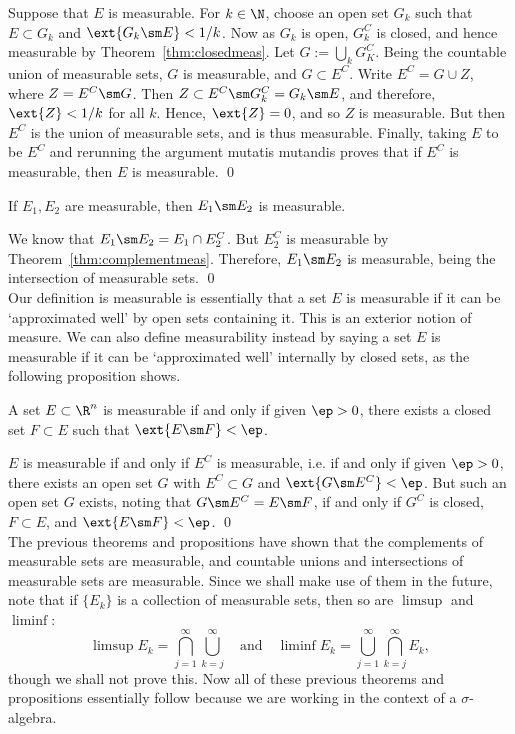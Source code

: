 \pf Suppose that $E$ is measurable. For $k \in \N$, choose an open set $G_k$ such that $E \subset G_k$ and $\ext{G_k \sm E}<1/k$. Now as $G_k$ is open, $G_k^C$ is closed, and hence measurable by Theorem~\ref{thm:closedmeas}. Let $G:= \bigcup_k G_K^C$. Being the countable union of measurable sets, $G$ is measurable, and $G \subset E^C$. Write $E^C= G \cup Z$, where $Z= E^C \sm G$. Then $Z \subset E^C \sm G_k^C= G_k \sm E$, and therefore, $\ext{Z}< 1/k$ for all $k$. Hence, $\ext{Z}=0$, and so $Z$ is measurable. But then $E^C$ is the union of measurable sets, and is thus measurable. Finally, taking $E$ to be $E^C$ and rerunning the argument mutatis mutandis proves that if $E^C$ is measurable, then $E$ is measurable. \qed \\


\begin{cor}
If $E_1, E_2$ are measurable, then $E_1 \sm E_2$ is measurable.
\end{cor}

\pf We know that $E_1 \sm E_2= E_1 \cap E_2^C$. But $E_2^C$ is measurable by Theorem~\ref{thm:complementmeas}. Therefore, $E_1 \sm E_2$ is measurable, being the intersection of measurable sets. \qed \\


Our definition is measurable is essentially that a set $E$ is measurable if it can be `approximated well' by open sets containing it. This is an exterior notion of measure. We can also define measurability instead by saying a set $E$ is measurable if it can be `approximated well' internally by closed sets, as the following proposition shows. 


\begin{prop} \label{prop:nearclosedmeas}
A set $E \subset \R^n$ is measurable if and only if given $\ep>0$, there exists a closed set $F \subset E$ such that $\ext{E \sm F}< \ep$. 
\end{prop}

\pf $E$ is measurable if and only if $E^C$ is measurable, i.e. if and only if given $\ep>0$, there exists an open set $G$ with $E^C \subset G$ and $\ext{G \sm E^C}<\ep$. But such an open set $G$ exists, noting that $G \sm E^C=E \sm F$, if and only if $G^C$ is closed, $F \subset E$, and $\ext{E \sm F}<\ep$. \qed \\




The previous theorems and propositions have shown that the complements of measurable sets are measurable, and countable unions and intersections of measurable sets are measurable. Since we shall make use of them in the future, note that if $\{E_k\}$ is a collection of measurable sets, then so are $\limsup$ and $\liminf$:
	\[
	\limsup E_k= \bigcap_{j=1}^\infty \bigcup_{k=j}^\infty \quad\text{and}\quad \liminf E_k= \bigcup_{j=1}^\infty \bigcap_{k=j}^\infty E_k,
	\]
though we shall not prove this. Now all of these previous theorems and propositions essentially follow because we are working in the context of a $\sigma$-algebra. 


